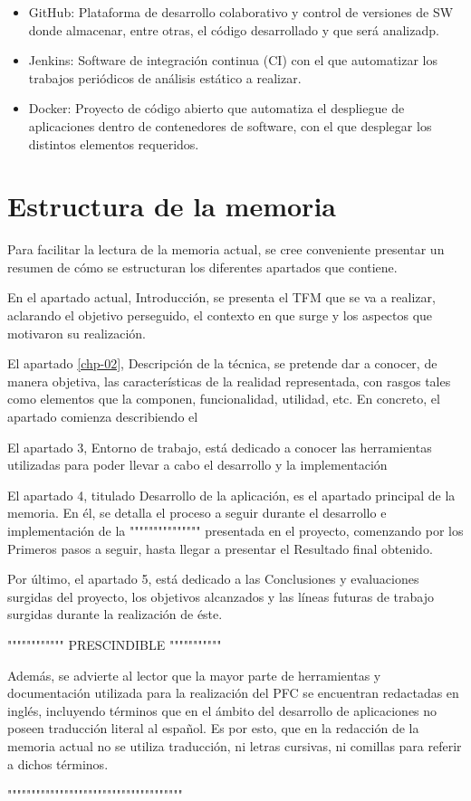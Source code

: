 \begin{itemize}
	\item GitHub\cite{github2017}: Plataforma de desarrollo colaborativo y control de versiones de \gls{SW} donde almacenar, entre otras, el código desarrollado y que será analizadp.
	\item Jenkins\cite{jenkins2017}: Software de integración continua (\gls{CI}) con el que automatizar los trabajos periódicos de análisis estático a realizar.
	\item Docker\cite{docker2017}: Proyecto de código abierto que automatiza el despliegue de aplicaciones dentro de contenedores de software, con el que desplegar los distintos elementos requeridos.
\end{itemize}


\section{Estructura de la memoria}


Para facilitar la lectura de la memoria actual, se cree conveniente presentar un resumen de cómo se estructuran los diferentes apartados que contiene.

En el apartado actual, Introducción, se presenta el \gls{TFM} que se va a realizar, aclarando el objetivo perseguido, el contexto en que surge y los aspectos que motivaron su realización.

El apartado \ref{chp-02}, Descripción de la técnica, se pretende dar a conocer, de manera objetiva, las características de la realidad representada, con rasgos tales como elementos que la componen, funcionalidad, utilidad, etc. En concreto, el apartado comienza describiendo el 

El apartado 3, Entorno de trabajo, está dedicado a conocer las herramientas utilizadas para poder llevar a cabo el desarrollo y la implementación 

El apartado 4, titulado Desarrollo de la aplicación, es el apartado principal de la memoria. En él, se detalla el proceso a seguir durante el desarrollo e implementación de la """"""""""""""" presentada en el proyecto, comenzando por los Primeros pasos a seguir, hasta llegar a presentar el Resultado final obtenido.

Por último, el apartado 5, está dedicado a las Conclusiones y evaluaciones surgidas del proyecto, los objetivos alcanzados y las líneas futuras de trabajo surgidas durante la realización de éste.

"""""""""""" PRESCINDIBLE """""""""""

Además, se advierte al lector que la mayor parte de herramientas y documentación utilizada para la realización del PFC se encuentran redactadas en inglés, incluyendo términos que en el ámbito del desarrollo de aplicaciones no poseen traducción literal al español. Es por esto, que en la redacción de la memoria actual no se utiliza traducción, ni letras cursivas, ni comillas para referir a dichos términos.

"""""""""""""""""""""""""""""""""""""


\endinput
